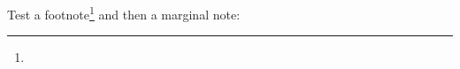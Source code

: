 \documentclass[12pt]{article}
\newcounter{xxx}
\begin{document}
Test a footnote\footnote{%
} and then a marginal note:
\end{document}
